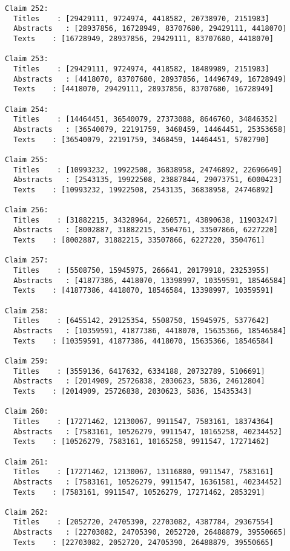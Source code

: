 \documentclass[11pt]{article}
\begin{document}
\begin{Verbatim}[commandchars=\\\{\}]
Claim 252:
  Titles    : [29429111, 9724974, 4418582, 20738970, 2151983]
  Abstracts   : [28937856, 16728949, 83707680, 29429111, 4418070]
  Texts    : [16728949, 28937856, 29429111, 83707680, 4418070]

Claim 253:
  Titles    : [29429111, 9724974, 4418582, 18489989, 2151983]
  Abstracts   : [4418070, 83707680, 28937856, 14496749, 16728949]
  Texts    : [4418070, 29429111, 28937856, 83707680, 16728949]

Claim 254:
  Titles    : [14464451, 36540079, 27373088, 8646760, 34846352]
  Abstracts   : [36540079, 22191759, 3468459, 14464451, 25353658]
  Texts    : [36540079, 22191759, 3468459, 14464451, 5702790]

Claim 255:
  Titles    : [10993232, 19922508, 36838958, 24746892, 22696649]
  Abstracts   : [2543135, 19922508, 23887844, 29073751, 6000423]
  Texts    : [10993232, 19922508, 2543135, 36838958, 24746892]

Claim 256:
  Titles    : [31882215, 34328964, 2260571, 43890638, 11903247]
  Abstracts   : [8002887, 31882215, 3504761, 33507866, 6227220]
  Texts    : [8002887, 31882215, 33507866, 6227220, 3504761]

Claim 257:
  Titles    : [5508750, 15945975, 266641, 20179918, 23253955]
  Abstracts   : [41877386, 4418070, 13398997, 10359591, 18546584]
  Texts    : [41877386, 4418070, 18546584, 13398997, 10359591]

Claim 258:
  Titles    : [6455142, 29125354, 5508750, 15945975, 5377642]
  Abstracts   : [10359591, 41877386, 4418070, 15635366, 18546584]
  Texts    : [10359591, 41877386, 4418070, 15635366, 18546584]

Claim 259:
  Titles    : [3559136, 6417632, 6334188, 20732789, 5106691]
  Abstracts   : [2014909, 25726838, 2030623, 5836, 24612804]
  Texts    : [2014909, 25726838, 2030623, 5836, 15435343]

Claim 260:
  Titles    : [17271462, 12130067, 9911547, 7583161, 18374364]
  Abstracts   : [7583161, 10526279, 9911547, 10165258, 40234452]
  Texts    : [10526279, 7583161, 10165258, 9911547, 17271462]

Claim 261:
  Titles    : [17271462, 12130067, 13116880, 9911547, 7583161]
  Abstracts   : [7583161, 10526279, 9911547, 16361581, 40234452]
  Texts    : [7583161, 9911547, 10526279, 17271462, 2853291]

Claim 262:
  Titles    : [2052720, 24705390, 22703082, 4387784, 29367554]
  Abstracts   : [22703082, 24705390, 2052720, 26488879, 39550665]
  Texts    : [22703082, 2052720, 24705390, 26488879, 39550665]


\end{Verbatim}
\end{document}
